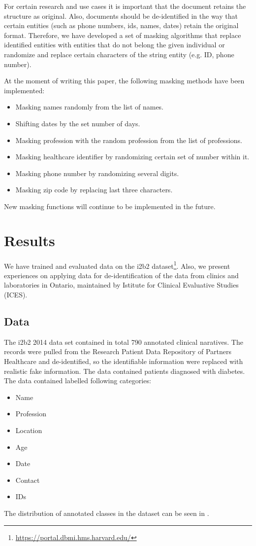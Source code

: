 \documentclass[a4paper,twoside]{article}
\begin{document}
For certain research and use cases it is important that the document retains the structure as original. Also, documents should be de-identified in the way that certain entities (such as phone numbers, ids, names, dates) retain the original format. Therefore, we have developed a set of masking algorithms that replace identified entities with entities that do not belong the given individual or randomize and replace certain characters of the string entity (e.g. ID, phone number). 

At the moment of writing this paper, the following masking methods have been implemented: 
\begin{itemize}
    \item Masking names randomly from the list of names.
    \item Shifting dates by the set number of days.
    \item Masking profession with the random profession from the list of professions.
    \item Masking healthcare identifier by randomizing certain set of number within it.
    \item Masking phone number by randomizing several digits.
    \item Masking zip code by replacing last three characters.
\end{itemize}

New masking functions will continue to be implemented in the future. 

\section{Results}

We have trained and evaluated data on the i2b2 dataset\footnote{\url{https://portal.dbmi.hms.harvard.edu/}}. Also, we present experiences on applying data for de-identification of the data from clinics and laboratories in Ontario, maintained by Istitute for Clinical Evaluative Studies (ICES). 

\subsection{Data}

The i2b2 2014 data set contained in total 790  annotated clinical naratives.  The records were pulled from the Research Patient Data Repository of Partners Healthcare and de-identified, so the identifiable information were replaced with realistic fake information. The data contained patients diagnosed with diabetes. The data contained labelled following categories:
\begin{itemize}
    \item Name
    \item Profession
    \item Location
    \item Age
    \item Date
    \item Contact
    \item IDs
\end{itemize}
The distribution of annotated classes in the dataset can be seen in \cite{stubbs2015annotating}. 
\end{document}
